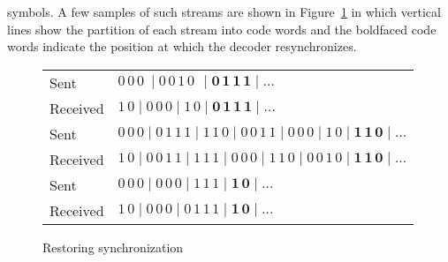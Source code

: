 \documentclass{irmaart}
\theoremstyle{plain}
\begin{document}
symbols. A few samples of such streams are shown in
Figure~\ref{KV:fig:decoding} in which vertical lines show the
partition of each stream into code words and the boldfaced code
words indicate the position at which the decoder resynchronizes.
\begin{figure}[h]
\begin{center}
\begin{tabular}{ll}
Sent & $0\,0\,0\ \mid 0\,0\,1\,0\,\ \mid\mathbf{0\,1\,1\,1\mid\dots}$\\
\mathstrut Received & $1\,0\mid 0\,0\,0 \mid 1\,0 \mid\mathbf{0\,1\,1\,1\mid\dots}$\\
\hline
\mathstrut Sent & $0\,0\,0\mid 0\,1\,1\,1 \mid 1\,1\,0\mid 0\,0\,1\,1 \mid 0\,0\,0 \mid 1\,0 \mid\mathbf{1\,1\,0\mid \dots}$\\
\mathstrut Received & $1\,0\mid 0\,0\,1\,1 \mid 1\,1\,1 \mid 0\,0\,0\mid 1\,1\,0 \mid 0\,0\,1\,0 \mid\mathbf{1\,1\,0\mid \dots}$\\
\hline
\mathstrut Sent & $0\,0\,0\mid 0\,0\,0 \mid 1\,1\,1\mid\mathbf{1\,0\mid \dots}$\\
\mathstrut Received & $1\,0\mid 0\,0\,0 \mid 0\,1\,1\,1 \mid\mathbf{1\,0\mid \dots}$
\end{tabular}
\caption{Restoring synchronization}\label{KV:fig:decoding}
\end{center}
\end{figure}
\end{document}
